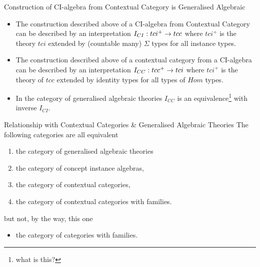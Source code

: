 \begin{frame}{Construction of CI-algebra from Contextual Category is Generalised Algebraic}
\begin{itemize}
\item The construction described above of a CI-algebra from Contextual Category can be described 
by an interpretation $I_{CI}:tci^+ \rightarrow tcc$ where $tci^+$ is the theory $tci$ extended 
by (countable many) $\Sigma$ types for all instance types. 
\item The construction described above of a contextual category from a CI-algebra can be described 
by an interpretation $I_{CC}:tcc^+ \rightarrow tci$ where $tci^+$ is the theory of $tcc$ extended by identity types for all types of $Hom$ types.
\item In the category of generalised algebraic theories $I_{CC}$ is an equivalence\footnote{what is this?} with inverse $I_{CI}$. 
\end{itemize}
\end{frame}




\begin{frame}{Relationship with Contextual Categories \& Generalised Algebraic Theories}
The following categories are all equivalent
\begin{enumerate}[(1)]
\item the category of generalised algebraic theories
\item the category of concept instance algebras,
\item the category of contextual categories,
\item the category of contextual categories with families.
\end{enumerate}
but not, by the way, this one 
\begin{itemize}
\item the category of categories with families.
\end{itemize}
\end{frame}


